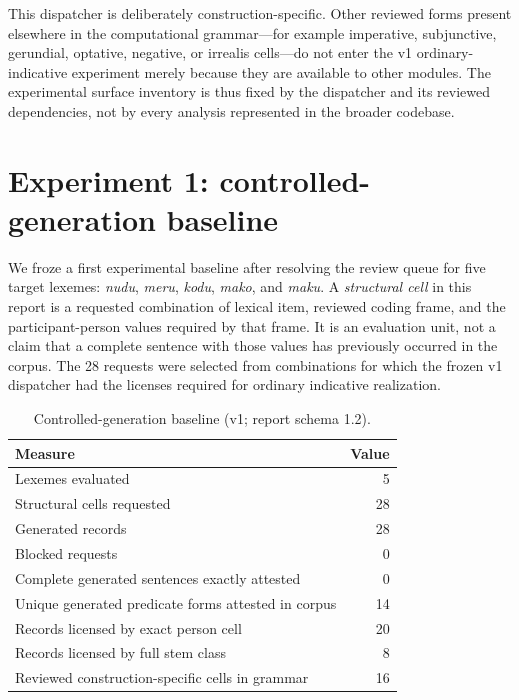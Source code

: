 \documentclass[11pt]{article}
\begin{document}
This dispatcher is deliberately construction-specific. Other reviewed forms
present elsewhere in the computational grammar---for example imperative,
subjunctive, gerundial, optative, negative, or irrealis cells---do not enter the
v1 ordinary-indicative experiment merely because they are available to other
modules. The experimental surface inventory is thus fixed by the dispatcher and
its reviewed dependencies, not by every analysis represented in the broader
codebase.

\section{Experiment 1: controlled-generation baseline}
\label{sec:evaluation}

We froze a first experimental baseline after resolving the review queue for five
target lexemes: \textit{nudu}, \textit{meru}, \textit{kodu}, \textit{mako},
and \textit{maku}. A \emph{structural cell} in this report is a requested
combination of lexical item, reviewed coding frame, and the participant-person
values required by that frame. It is an evaluation unit, not a claim that a
complete sentence with those values has previously occurred in the corpus. The
28 requests were selected from combinations for which the frozen v1 dispatcher
had the licenses required for ordinary indicative realization.

\begin{table}[ht]
\centering
\caption{Controlled-generation baseline (v1; report schema 1.2).}
\label{tab:baseline}
\begin{tabular}{lr}
\toprule
Measure & Value\\
\midrule
Lexemes evaluated & 5\\
Structural cells requested & 28\\
Generated records & 28\\
Blocked requests & 0\\
Complete generated sentences exactly attested & 0\\
Unique generated predicate forms attested in corpus & 14\\
Records licensed by exact person cell & 20\\
Records licensed by full stem class & 8\\
Reviewed construction-specific cells in grammar & 16\\
\bottomrule
\end{tabular}
\end{table}
\end{document}
